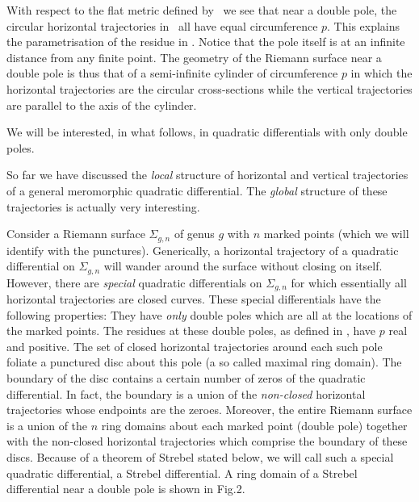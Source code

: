 With respect to the flat metric defined by \qdmet\ we see that 
near a double pole, the circular horizontal trajectories in \dphor\ 
all have equal circumference $p$. This explains the parametrisation 
of the residue in \dpole . Notice that the pole itself is at an 
infinite distance from any finite point.
The geometry of the Riemann surface 
near a double pole is thus that of a semi-infinite cylinder of 
circumference $p$ in which the 
horizontal trajectories are the circular cross-sections while the 
vertical trajectories are parallel to the axis of the cylinder.

We will be interested, in what follows, in quadratic differentials
with only double poles. 


So far we have discussed the {\it local} structure of horizontal and 
vertical trajectories of a general meromorphic quadratic 
differential. The {\it global} structure of these trajectories is actually
very interesting. 

Consider a Riemann surface $\Sigma_{g,n}$ of genus $g$ with $n$ 
marked points (which we will identify with the punctures).
Generically, a horizontal trajectory of a quadratic differential on
$\Sigma_{g,n}$ will wander around the surface without closing 
on itself. However, there 
are {\it special} quadratic differentials on $\Sigma_{g,n}$
for which essentially all horizontal trajectories are closed curves. 
These special differentials have the following properties:
They have {\it only}  double poles which are all at 
the locations of the marked points. The residues at these double poles, 
as defined in \dpole ,  have 
$p$ real and positive. The set of closed 
horizontal trajectories around each such pole foliate a punctured disc 
about this pole (a so called maximal ring domain). The boundary of the disc 
contains a certain number of zeros 
of the quadratic differential. In fact, the boundary  
is a union of the {\it non-closed} 
horizontal trajectories whose endpoints are the zeroes. Moreover, 
the entire Riemann surface is a union of the $n$ ring domains about each 
marked point (double pole) together with the non-closed horizontal 
trajectories which comprise the boundary of these discs.  
Because of a theorem of Strebel stated below, we will call such a 
special quadratic differential, a Strebel differential. 
A ring domain of a Strebel differential near a double pole is shown 
in Fig.2. 

